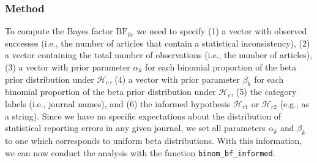 \documentclass[
  english,
  man,floatsintext]{apa6}
\begin{document}
\hypertarget{method-1}{%
\subsubsection{Method}\label{method-1}}

To compute the Bayes factor \(\text{BF}_{0r}\) we need to specify (1) a vector with observed successes (i.e., the number of articles that contain a statistical inconsistency), (2) a vector containing the total number of observations (i.e., the number of articles), (3) a vector with prior parameter \(\alpha_k\) for each binomial proportion of the beta prior distribution under \(\mathcal{H}_e\), (4) a vector with prior parameter \(\beta_k\) for each binomial proportion of the beta prior distribution under \(\mathcal{H}_e\), (5) the category labels (i.e., journal names), and (6) the informed hypothesis \(\mathcal{H}_{r1}\) or \(\mathcal{H}_{r2}\) (e.g., as a string). Since we have no specific expectations about the distribution of statistical reporting errors in any given journal, we set all parameters \(\alpha_k\) and \(\beta_k\) to one which corresponds to uniform beta distributions. With this information, we can now conduct the analysis with the function \texttt{binom\_bf\_informed}.
\end{document}
